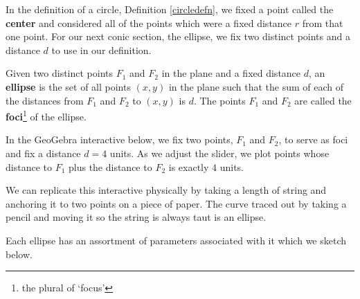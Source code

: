 \documentclass{ximera}
\begin{document}
	\author{Stitz-Zeager}




\setcounter{footnote}{0}

\label{Ellipses}

In the definition of a circle, Definition \ref{circledefn}, we fixed a point called the \textbf{center} and considered all of the points which were a fixed distance $r$ from that one point.  For our next conic section, the ellipse, we fix two distinct points and a distance $d$ to use in our definition.  

 


 \begin{definition} \label{ellipsedefn} Given two distinct points $F_1$ and $F_2$ in the plane and a fixed distance $d$, an   \textbf{ellipse} is the set of all points $(x, y)$ in the plane such that the sum of each of the distances from $F_1$ and $F_2$ to $(x, y)$ is $d$.  The points $F_1$ and $F_2$ are called the   \textbf{foci}\footnote{the plural of `focus'} of the ellipse.

\end{definition} 



In the GeoGebra interactive below, we fix two points, $F_{1}$ and $F_{2}$, to serve as foci and fix a distance $d = 4$ units.  As we adjust the slider, we plot points whose distance to $F_{1}$ plus the distance to $F_{2}$ is exactly $4$ units.

\begin{center}
\end{center}


We can replicate this interactive physically by taking a length of string and anchoring it to two points on a piece of paper.  The curve traced out by taking a pencil and moving it so the string is always taut is an ellipse.  


Each ellipse has an assortment of parameters associated with it which we sketch below.
\end{document}
